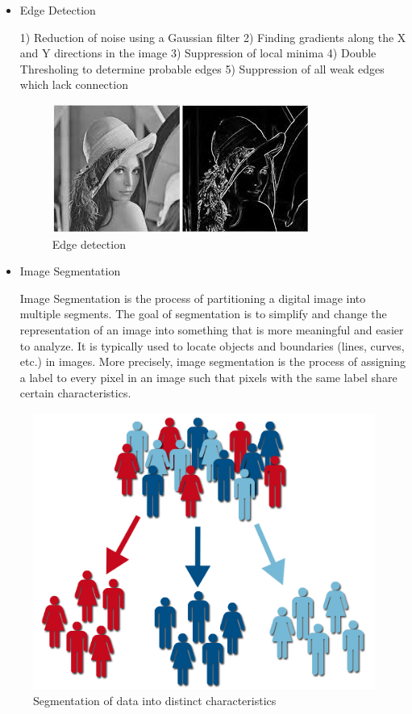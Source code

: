 \documentclass{article}
\begin{document}
\begin{multicols*}{2}
\begin{itemize}
\item Edge Detection

1) Reduction of noise using a Gaussian filter
2) Finding gradients along the X and Y directions in the image
3) Suppression of local minima
4) Double Thresholing to determine probable edges
5) Suppression of all weak edges which lack connection
\begin{figure}[H]
\centering
\includegraphics[scale=0.5]{edge.jpeg}
\caption{Edge detection}
\end{figure}


\item Image Segmentation

Image Segmentation is the process of partitioning a digital image into multiple segments. The goal of segmentation is to simplify and change the representation of an image into something that is more meaningful and easier to analyze. It is typically used to locate objects and boundaries (lines, curves, etc.) in images. More precisely, image segmentation is the process of assigning a label to every pixel in an image such that pixels with the same label share certain characteristics.
\end{itemize}
\begin{figure}[H]
\centering
\includegraphics[scale=0.1]{segmentation.jpg}
\caption{Segmentation of data into distinct characteristics}
\end{figure}



\end{multicols*}
\end{document}

